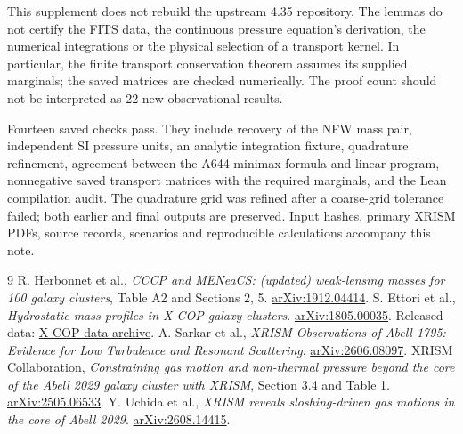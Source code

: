 \documentclass[11pt]{article}
\begin{document}
This supplement does not rebuild the upstream 4.35 repository. The lemmas do not certify the FITS data, the continuous pressure equation's derivation, the numerical integrations or the physical selection of a transport kernel. In particular, the finite transport conservation theorem assumes its supplied marginals; the saved matrices are checked numerically. The proof count should not be interpreted as 22 new observational results.

Fourteen saved checks pass. They include recovery of the NFW mass pair, independent SI pressure units, an analytic integration fixture, quadrature refinement, agreement between the A644 minimax formula and linear program, nonnegative saved transport matrices with the required marginals, and the Lean compilation audit. The quadrature grid was refined after a coarse-grid tolerance failed; both earlier and final outputs are preserved. Input hashes, primary XRISM PDFs, source records, scenarios and reproducible calculations accompany this note.

\begin{thebibliography}{9}\small
{}
R. Herbonnet et al., \emph{CCCP and MENeaCS: (updated) weak-lensing masses for 100 galaxy clusters}, Table A2 and Sections 2, 5.
\href{https://arxiv.org/abs/1912.04414}{arXiv:1912.04414}.
S. Ettori et al., \emph{Hydrostatic mass profiles in X-COP galaxy clusters}.
\href{https://arxiv.org/abs/1805.00035}{arXiv:1805.00035}.
Released data: \href{https://dominiqueeckert.wixsite.com/xcop/data}{X-COP data archive}.
A. Sarkar et al., \emph{XRISM Observations of Abell 1795: Evidence for Low Turbulence and Resonant Scattering}.
\href{https://arxiv.org/abs/2606.08097}{arXiv:2606.08097}.
XRISM Collaboration, \emph{Constraining gas motion and non-thermal pressure beyond the core of the Abell 2029 galaxy cluster with XRISM}, Section 3.4 and Table 1.
\href{https://arxiv.org/abs/2505.06533}{arXiv:2505.06533}.
Y. Uchida et al., \emph{XRISM reveals sloshing-driven gas motions in the core of Abell 2029}.
\href{https://arxiv.org/abs/2608.14415}{arXiv:2608.14415}.
\end{thebibliography}
\end{document}
